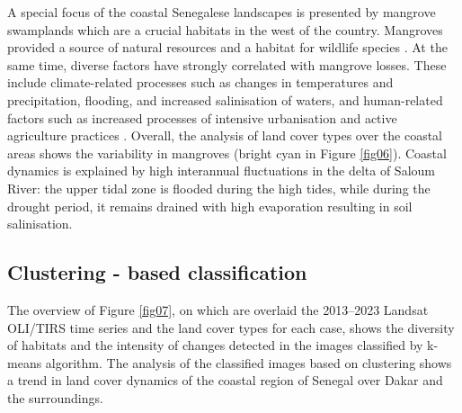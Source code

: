 \documentclass[earth,article,submit,pdftex,moreauthors]{Definitions/mdpi}
\begin{document}
{A special focus of{ the} {coastal Senegalese landscapes is presented by} mangrove swamplands which are a crucial {habitats} {in the west of the country}{. Mangroves provided }a source of natural resources \cite{Carney} and a habitat for {wildlife }species \cite{Galat}. At the same time, diverse factors have strongly correlated with mangrove losses. These include climate-related processes such as changes in temperatures and precipitation, flooding, and increased salinisation of waters, and human-related factors such as increased processes of intensive urbanisation \cite{land10100996} and active agriculture practices \cite{Branoff}. Overall, the analysis of land cover types over the coastal areas shows the variability in mangroves ({bright} cyan in Figure \ref{fig06}){. Coastal dynamics }is explained by{ }high interannual fluctuations in the delta of Saloum River{:} the upper tidal zone is flooded during the high tides{, while }during the drought period, {it} remains drained with {high evaporation resulting in soil} salinisation. 

\subsection{{Clustering - based classification}}

{The overview of Figure} \ref{fig07}, {on which are overlaid the 2013--2023 Landsat OLI/TIRS time series and the land cover
types for each{ }case, shows the diversity of habitats and {the }intensity of changes {detected} in the images classified by k-means algorithm.} The analysis of the classified images {based on clustering}{ }shows a trend in land cover dynamics of the coastal region of Senegal over Dakar and {the surroundings}. 

}
\end{document}
